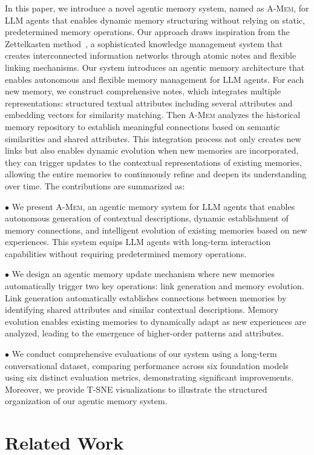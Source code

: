 \documentclass{article}
\newcommand{\ours}{\textsc{A-Mem}\xspace}
\begin{document}
In this paper, we introduce a novel agentic memory system, named as \ours, for LLM agents that enables dynamic memory structuring without relying on static, predetermined memory operations. Our approach draws inspiration from the Zettelkasten method~\cite{zettel1,zettel2}, a sophisticated knowledge management system that creates interconnected information networks through atomic notes and flexible linking mechanisms.
Our system introduces an agentic memory architecture that enables autonomous and flexible memory management for LLM agents. For each new memory, we construct comprehensive notes, which integrates multiple representations: structured textual attributes including several attributes and embedding vectors for similarity matching. 
Then \ours analyzes the historical memory repository to establish meaningful connections based on semantic similarities and shared attributes. This integration process not only creates new links but also enables dynamic evolution when new memories are incorporated, they can trigger updates to the contextual representations of existing memories, allowing the entire memories to continuously refine and deepen its understanding over time.
The contributions are summarized as:

$\bullet$ We present \ours, an agentic memory system for LLM agents that enables autonomous generation of contextual descriptions, dynamic establishment of memory connections, and intelligent evolution of existing memories based on new experiences. This system equips LLM agents with long-term interaction capabilities without requiring predetermined memory operations.

$\bullet$ We design an agentic memory update mechanism where new memories automatically trigger two key operations: link generation and memory evolution. Link generation automatically establishes connections between memories by identifying shared attributes and similar contextual descriptions. Memory evolution enables existing memories to dynamically adapt as new experiences are analyzed, leading to the emergence of higher-order patterns and attributes.

$\bullet$ We conduct comprehensive evaluations of our system using a long-term conversational dataset, comparing performance across six foundation models using six distinct evaluation metrics, demonstrating significant improvements. Moreover, we provide T-SNE visualizations to illustrate the structured organization of our agentic memory system.

\section{Related Work}
\end{document}
